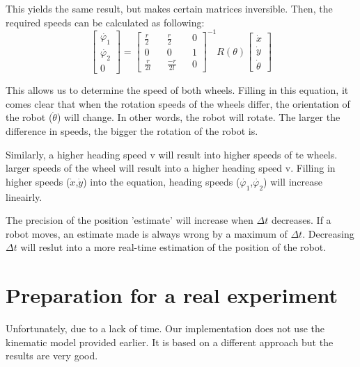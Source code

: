 \documentclass[12pt]{article}
\begin{document}
This yields the same result, but makes certain matrices inversible. Then, the required speeds can be calculated as following:
\begin{equation}
\begin{bmatrix}
\dot{\varphi_1} \\
\dot{\varphi_2} \\
0
\end{bmatrix}
= 
\begin{bmatrix} \frac{r}{2} && \frac{r}{2} && 0 \\ 
0 && 0  && 1\\ 
\frac{r}{2l} && \frac{-r}{2l} && 0\end{bmatrix}^{-1}
R(\theta)
\begin{bmatrix} \dot{x} \\ \dot{y} \\ \dot{\theta} \end{bmatrix}
\end{equation}

This allows us to determine the speed of both wheels.
Filling in this equation, it comes clear that when the rotation speeds of the wheels differ, the orientation of the robot ($\dot{\theta}$) will change. In other words, the robot will rotate. The larger the difference in speeds, the bigger the rotation of the robot is.

Similarly, a higher heading speed v will result into higher speeds of te wheels.
larger speeds of the wheel will result into a higher heading speed v. Filling in higher speeds ($\dot{x}$,$\dot{y}$) into the equation, heading speeds ($\dot{\varphi_1}$,$\dot{\varphi_2}$) will increase lineairly. 

The precision of the position 'estimate' will increase when ${\Delta}t$ decreases. If a robot moves, an estimate made is always wrong by a maximum of ${\Delta}t$. Decreasing ${\Delta}t$ will reslut into a more real-time estimation of the position of the robot. 
\section{Preparation for a real experiment}
Unfortunately, due to a lack of time. Our implementation does not use the kinematic model provided earlier. It is based on a different approach but the results are very good.
\end{document}
